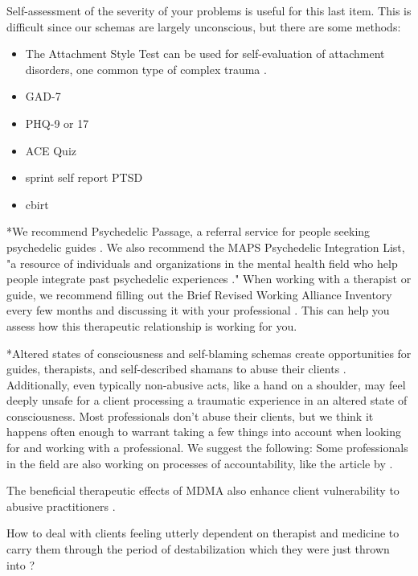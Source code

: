 \documentclass[12pt,letterpaper]{article}
\begin{document}
Self-assessment of the severity of your problems is useful for this last item. This is difficult since our schemas are largely unconscious, but there are some methods:
\begin{itemize}
    \item The Attachment Style Test can be used for self-evaluation of attachment disorders, one common type of complex trauma \cite{attachmentProject}.
    \item GAD-7
    \item PHQ-9 or 17
    \item ACE Quiz
    \item sprint self report PTSD
    \item cbirt
\end{itemize}
*We recommend Psychedelic Passage, a referral service for people seeking psychedelic guides \cite{psychedelicPassage}. We also recommend the MAPS Psychedelic Integration List, "a resource of individuals and organizations in the mental health field who help people integrate past psychedelic experiences \cite{mapsIntegrationList}." When working with a therapist or guide, we recommend filling out the Brief Revised Working Alliance Inventory every few months and discussing it with your professional \cite{BRWAIdownload,mallinckrodtBRWAI}. This can help you assess how this therapeutic relationship is working for you.

*Altered states of consciousness and self-blaming schemas create opportunities for guides, therapists, and self-described shamans to abuse their clients \cite{therapistAbuse,sessaAbuse,powerTrip}. Additionally, even typically non-abusive acts, like a hand on a shoulder, may feel deeply unsafe for a client processing a traumatic experience in an altered state of consciousness.  Most professionals don't abuse their clients, but we think it happens often enough to warrant taking a few things into account when looking for and working with a professional. We suggest the following: \todo{} Some professionals in the field are also working on processes of accountability, like the article by \textcite{accountabilityMartinez}.

The beneficial therapeutic effects of MDMA also enhance client vulnerability to abusive practitioners \cite{patientVulnerability}.

How to deal with clients feeling utterly dependent on therapist and medicine to carry them through the period of destabilization which they were just thrown into \cite{studyingHarms}?
\end{document}

